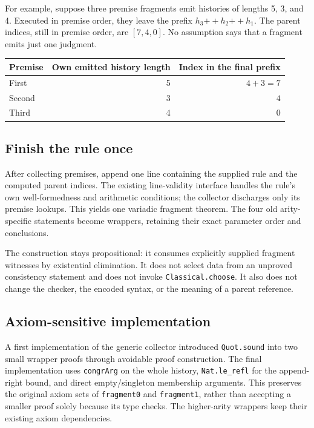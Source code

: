 \documentclass[11pt]{article}
\theoremstyle{remark}\newtheorem{remark}[proposition]{Remark}
\newcommand{\code}[1]{\nolinkurl{#1}}
\begin{document}
For example, suppose three premise fragments emit histories of lengths 5, 3, and 4. Executed in premise order, they leave the prefix \(h_3\mathbin{+\!+}h_2\mathbin{+\!+}h_1\). The parent indices, still in premise order, are \([7,4,0]\). No assumption says that a fragment emits just one judgment.

\begin{center}
\begin{tabular}{lrr}
\toprule
Premise & Own emitted history length & Index in the final prefix\\\midrule
First & 5 & \(4+3=7\)\\
Second & 3 & \(4\)\\
Third & 4 & \(0\)\\\bottomrule
\end{tabular}
\end{center}

\subsection{Finish the rule once}

After collecting premises, append one line containing the supplied rule and the computed parent indices. The existing line-validity interface handles the rule's own well-formedness and arithmetic conditions; the collector discharges only its premise lookups. This yields one variadic fragment theorem. The four old arity-specific statements become wrappers, retaining their exact parameter order and conclusions.

The construction stays propositional: it consumes explicitly supplied fragment witnesses by existential elimination. It does not select data from an unproved consistency statement and does not invoke \code{Classical.choose}. It also does not change the checker, the encoded syntax, or the meaning of a parent reference.

\subsection{Axiom-sensitive implementation}

A first implementation of the generic collector introduced \code{Quot.sound} into two small wrapper proofs through avoidable proof construction. The final implementation uses \code{congrArg} on the whole history, \code{Nat.le_refl} for the append-right bound, and direct empty/singleton membership arguments. This preserves the original axiom sets of \code{fragment0} and \code{fragment1}, rather than accepting a smaller proof solely because its type checks. The higher-arity wrappers keep their existing axiom dependencies.
\end{document}
